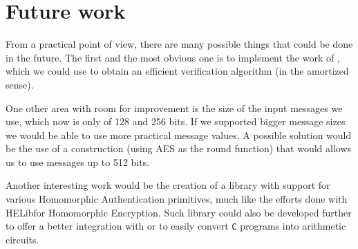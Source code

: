 \section{Future work}
From a practical point of view, there are many possible things that could be
done in the future. The first and the most obvious one is to implement the work
of \textcite{backes:fiore:reischuk:2013}, which we could use to obtain an
efficient verification algorithm (in the amortized sense).

One other area with room for improvement is the size of the input messages we
use, which now is only of 128 and 256 bits. If we supported bigger message
sizes we would be able to use more practical message values. A possible
solution would be the use of a \textcite{lubyrackoff} construction (using AES
as the round function) that would allows us to use messages up to 512 bits.

Another interesting work would be the creation of a library with support for
various Homomorphic Authentication primitives, much like the efforts done with
HELib\footnotemark for Homomorphic Encryption. Such library could also be
developed further to offer a better integration with
 or  to easily
convert \texttt{C} programs into arithmetic circuits.
